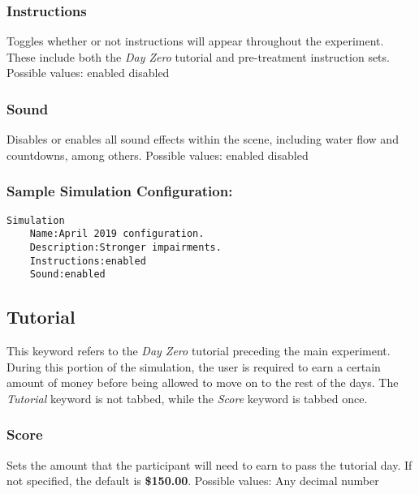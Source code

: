 \documentclass{article}
\begin{document}
\subsubsection*{Instructions} Toggles whether or not instructions will appear throughout the experiment. These include both the \textit{Day Zero} tutorial and pre-treatment instruction sets.
\newline \indent Possible values: \newline
\indent\indent enabled \newline
\indent\indent disabled

\subsubsection*{Sound} Disables or enables all sound effects within the scene, including water flow and countdowns, among others.
\newline \indent Possible values: \newline
\indent\indent enabled \newline
\indent\indent disabled

\subsubsection*{Sample Simulation Configuration:}
\begin{lstlisting}
Simulation
    Name:April 2019 configuration.
    Description:Stronger impairments.
    Instructions:enabled
    Sound:enabled
\end{lstlisting} 

\subsection*{Tutorial}
This keyword refers to the \textit{Day Zero} tutorial preceding the main experiment. During this portion of the simulation, the user is required to earn a certain amount of money before being allowed to move on to the rest of the days. The \textit{Tutorial} keyword is not tabbed, while the \textit{Score} keyword is tabbed once.

\subsubsection*{Score} Sets the amount that the participant will need to earn to pass the tutorial day. If not specified, the default is \textbf{\$150.00}. \newline
\indent Possible values: \newline
\indent\indent Any decimal number \newline
\end{document}
